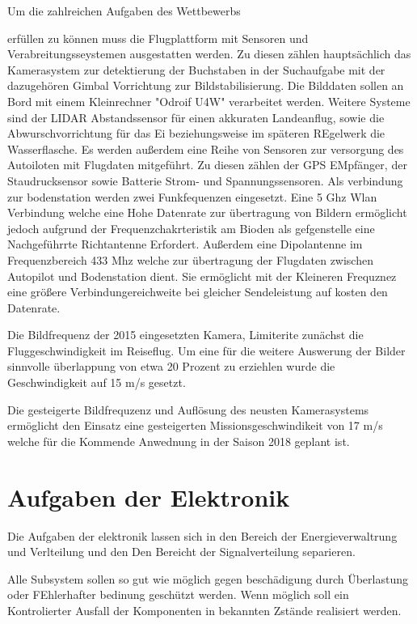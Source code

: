 Um die zahlreichen Aufgaben des Wettbewerbs \begin{comment} Verweis auf Wettbewerbsaufben \end{comment}
erfüllen zu können muss die Flugplattform mit Sensoren und Verabreitungsseystemen ausgestatten werden.
Zu diesen zählen hauptsächlich das Kamerasystem zur detektierung der Buchstaben in der Suchaufgabe mit der dazugehören
Gimbal Vorrichtung zur Bildstabilisierung. Die Bilddaten sollen an Bord mit einem Kleinrechner "Odroif U4W" verarbeitet werden. Weitere Systeme sind der LIDAR Abstandssensor für einen akkuraten Landeanflug, sowie die Abwurschvorrichtung für das Ei beziehungsweise im späteren REgelwerk die Wasserflasche.
Es werden außerdem eine Reihe von Sensoren zur versorgung des Autoiloten mit Flugdaten mitgeführt. Zu diesen zählen der GPS EMpfänger, der Staudrucksensor sowie Batterie Strom- und Spannungssensoren.
Als verbindung zur bodenstation werden zwei Funkfequenzen eingesetzt.
Eine 5 Ghz Wlan Verbindung welche eine Hohe Datenrate zur übertragung von Bildern  ermöglicht jedoch aufgrund der Frequenzchakrteristik am Bioden als gefgenstelle eine Nachgeführrte Richtantenne Erfordert.
Außerdem eine Dipolantenne im Frequenzbereich 433 Mhz welche zur übertragung der Flugdaten zwischen Autopilot und Bodenstation dient. Sie ermöglicht mit der Kleineren Frequznez eine größere Verbindungereichweite bei gleicher Sendeleistung auf kosten den Datenrate.

Die Bildfrequenz der 2015 eingesetzten Kamera, Limiterite zunächst die Fluggeschwindigkeit im Reiseflug. Um eine für die weitere Auswerung der Bilder sinnvolle überlappung von etwa 20 Prozent zu erziehlen wurde die Geschwindigkeit auf 15 m/s gesetzt.

Die gesteigerte Bildfrequzenz und Auflösung des neusten Kamerasystems ermöglicht den Einsatz eine gesteigerten Missionsgeschwindikeit von 17 m/s welche für die Kommende Anwednung in der Saison 2018 geplant ist.

\section{Aufgaben der Elektronik}

Die Aufgaben der elektronik lassen sich in den Bereich der Energieverwaltrung und Verlteilung  und den Den Bereicht der Signalverteilung separieren.

Alle Subsystem sollen so gut wie möglich gegen beschädigung durch Überlastung oder FEhlerhafter bedinung geschützt werden.
Wenn möglich soll ein Kontrolierter Ausfall der Komponenten in bekannten Zstände realisiert werden.

